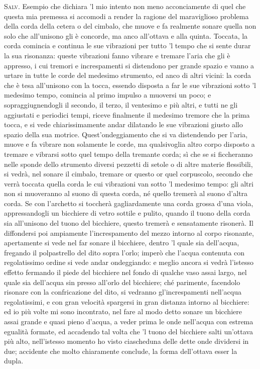 \documentclass[11pt,twoside,openany]{book}
\newcommand{\speaker}[1]{\textcolor{rubric}{\textsc{#1}}\space}
\begin{document}
\speaker{Salv.} Esempio che dichiara 'l mio intento non meno acconciamente di quel che questa mia premessa si accomodi a render la ragione del maraviglioso problema della corda della cetera o del cimbalo, che muove e fa realmente sonare quella non solo che all'unisono gli è concorde, ma anco all'ottava e alla quinta. Toccata, la corda comincia e continua le sue vibrazioni per tutto 'l tempo che si sente durar la sua risonanza: queste vibrazioni fanno vibrare e tremare l'aria che gli è appresso, i cui tremori e increspamenti si distendono per grande spazio e vanno a urtare in tutte le corde del medesimo strumento, ed anco di altri vicini: la corda che è tesa all'unisono con la tocca, essendo disposta a far le sue vibrazioni sotto 'l medesimo tempo, comincia al primo impulso a muoversi un poco; e sopraggiugnendogli il secondo, il terzo, il ventesimo e più altri, e tutti ne gli aggiustati e periodici tempi, riceve finalmente il medesimo tremore che la prima tocca, e si vede chiarissimamente andar dilatando le sue vibrazioni giusto allo spazio della sua motrice. Quest'ondeggiamento che si va distendendo per l'aria, muove e fa vibrare non solamente le corde, ma qualsivoglia altro corpo disposto a tremare e vibrarsi sotto quel tempo della tremante corda; sì che se si ficcheranno nelle sponde dello strumento diversi pezzetti di setole o di altre materie flessibili, si vedrà, nel sonare il cimbalo, tremare or questo or quel corpuscolo, secondo che verrà toccata quella corda le cui vibrazioni van sotto 'l medesimo tempo: gli altri non si muoveranno al suono di questa corda, né quello tremerà al suono d'altra corda. Se con l'archetto si toccherà gagliardamente una corda grossa d'una viola, appressandogli un bicchiere di vetro sottile e pulito, quando il tuono della corda sia all'unisono del tuono del bicchiere, questo tremerà e sensatamente risonerà. Il diffondersi poi ampiamente l'increspamento del mezzo intorno al corpo risonante, apertamente si vede nel far sonare il bicchiere, dentro 'l quale sia dell'acqua, fregando il polpastrello del dito sopra l'orlo; imperò che l'acqua contenuta con regolatissimo ordine si vede andar ondeggiando: e meglio ancora si vedrà l'istesso effetto fermando il piede del bicchiere nel fondo di qualche vaso assai largo, nel quale sia dell'acqua sin presso all'orlo del bicchiere; ché parimente, facendolo risonare con la confricazione del dito, si vedranno gl'increspamenti nell'acqua regolatissimi, e con gran velocità spargersi in gran distanza intorno al bicchiere: ed io più volte mi sono incontrato, nel fare al modo detto sonare un bicchiere assai grande e quasi pieno d'acqua, a veder prima le onde nell'acqua con estrema egualità formate, ed accadendo tal volta che 'l tuono del bicchiere salti un'ottava più alto, nell'istesso momento ho visto ciascheduna delle dette onde dividersi in due; accidente che molto chiaramente conclude, la forma dell'ottava esser la dupla.
\end{document}

